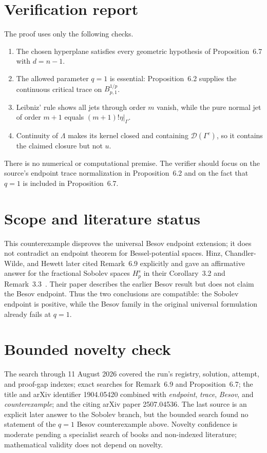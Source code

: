 \documentclass[11pt]{article}
\newcommand{\D}{\mathcal{D}}
\begin{document}
\section{Verification report}

The proof uses only the following checks.
\begin{enumerate}
\item The chosen hyperplane satisfies every geometric hypothesis of
Proposition~6.7 with $d=n-1$.
\item The allowed parameter $q=1$ is essential: Proposition~6.2 supplies
the continuous critical trace on $B^{1/p}_{p,1}$.
\item Leibniz' rule shows all jets through order $m$ vanish, while the pure
normal jet of order $m+1$ equals $(m+1)!\eta|_\Gamma$.
\item Continuity of $\Lambda$ makes its kernel closed and containing
$\D(\Gamma^c)$, so it contains the claimed closure but not $u$.
\end{enumerate}
There is no numerical or computational premise.  The verifier should focus on
the source's endpoint trace normalization in Proposition~6.2 and on the fact
that $q=1$ is included in Proposition~6.7.

\section{Scope and literature status}

This counterexample disproves the universal Besov endpoint extension; it does
not contradict an endpoint theorem for Bessel-potential spaces.  Hinz,
Chandler-Wilde, and Hewett later cited Remark~6.9 explicitly and gave an
affirmative answer for the fractional Sobolev spaces $H_p^s$ in their
Corollary~3.2 and Remark~3.3~\cite{HCH}.  Their paper describes the earlier
Besov result but does not claim the Besov endpoint.  Thus the two conclusions
are compatible: the Sobolev endpoint is positive, while the Besov family in
the original universal formulation already fails at $q=1$.

\section{Bounded novelty check}

The search through 11 August 2026 covered the run's registry, solution,
attempt, and proof-gap indexes; exact searches for Remark~6.9 and
Proposition~6.7; the title and arXiv identifier 1904.05420 combined with
\emph{endpoint}, \emph{trace}, \emph{Besov}, and \emph{counterexample}; and
the citing arXiv paper 2507.04536.  The last source is an explicit later
answer to the Sobolev branch, but the bounded search found no statement of
the $q=1$ Besov counterexample above.  Novelty confidence is moderate pending
a specialist search of books and non-indexed literature; mathematical
validity does not depend on novelty.
\end{document}

